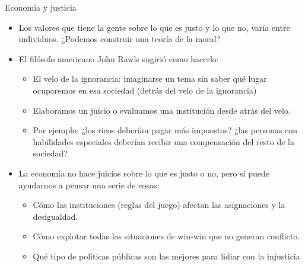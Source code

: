 \documentclass{beamer}
\begin{document}
\begin{frame}{Economía y justicia}
    \begin{itemize}
        \item Los valores que tiene la gente sobre lo que es justo y lo que no, varía entre individuos. ¿Podemos construir una teoría de la moral?
        \item El filósofo americano John Rawls sugirió como hacerlo:
        \begin{itemize}
            \item El velo de la ignorancia: imaginarse un tema sin saber qué lugar ocuparemos en esa sociedad (detrás del velo de la ignorancia)
            \item Elaboramos un juicio o evaluamos una institución desde atrás del velo.
            \item Por ejemplo: ¿los ricos deberían pagar más impuestos? ¿las personas con habilidades especiales deberían recibir una compensación del resto de la sociedad? 
          \end{itemize}
        \item La economía no hace juicios sobre lo que es justo o no, pero sí puede ayudarnos a pensar una serie de cosas: 
        \begin{itemize}
        \item Cómo las instituciones (reglas del juego) afectan las asignaciones y la desigualdad.
        \item  Cómo explotar todas las situaciones de win-win que no generan conflicto.
        \item Qué tipo de políticas públicas son las mejores para lidiar con la injusticia
    \end{itemize}
    \end{itemize}
\end{frame}
\end{document}
